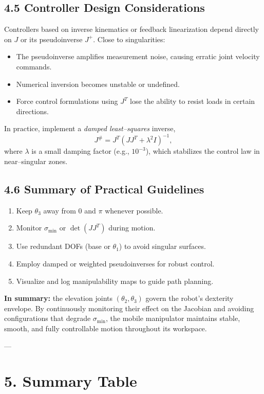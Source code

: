 \documentclass[12pt,a4paper]{article}
\begin{document}
\subsection*{4.5 Controller Design Considerations}
Controllers based on inverse kinematics or feedback linearization
depend directly on $J$ or its pseudoinverse $J^{+}$.
Close to singularities:
\begin{itemize}
  \item The pseudoinverse amplifies measurement noise,
        causing erratic joint velocity commands.
  \item Numerical inversion becomes unstable or undefined.
  \item Force control formulations using $J^{T}$ lose the ability
        to resist loads in certain directions.
\end{itemize}
In practice, implement a \emph{damped least--squares} inverse,
\[
J^{\#} = J^{T}(J J^{T} + \lambda^2 I)^{-1},
\]
where $\lambda$ is a small damping factor (e.g., $10^{-3}$),
which stabilizes the control law in near--singular zones.

\subsection*{4.6 Summary of Practical Guidelines}
\begin{enumerate}
  \item Keep $\theta_3$ away from $0$ and $\pi$ whenever possible.
  \item Monitor $\sigma_{\min}$ or $\det(JJ^{T})$ during motion.
  \item Use redundant DOFs (base or $\theta_1$) to avoid singular surfaces.
  \item Employ damped or weighted pseudoinverses for robust control.
  \item Visualize and log manipulability maps to guide path planning.
\end{enumerate}

\bigskip
\textbf{In summary:}
the elevation joints $(\theta_2,\theta_3)$ govern the robot's
dexterity envelope.
By continuously monitoring their effect on the Jacobian and
avoiding configurations that degrade $\sigma_{\min}$,
the mobile manipulator maintains stable, smooth, and fully controllable motion
throughout its workspace.


---

\section*{5. Summary Table}
\end{document}
